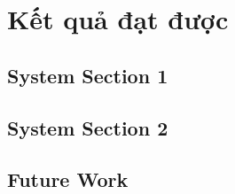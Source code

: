 %
\chapter{Kết quả đạt được}
\label{sec:conclusion}

\Blindtext[2][1]

\section{System Section 1}
\label{sec:conclusion:sec1}

\Blindtext[2][2]

\section{System Section 2}
\label{sec:conclusion:sec2}

\Blindtext[3][2]

\section{Future Work}
\label{sec:conclusion:future}

\Blindtext[2][2]
